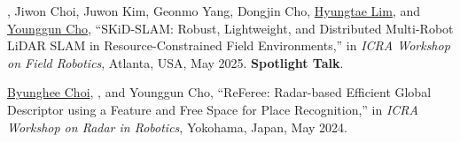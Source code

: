 \begin{pubSubsectionNum}
    \item \hogyunkim, Jiwon Choi, Juwon Kim, Geonmo Yang, Dongjin Cho, \underline{Hyungtae Lim}, and \underline{Younggun Cho}, ``SKiD-SLAM: Robust, Lightweight, and Distributed Multi-Robot LiDAR SLAM in Resource-Constrained Field Environments,'' in \textit{ICRA Workshop on Field Robotics}, Atlanta, USA, May 2025. \textbf{Spotlight Talk}.
    \item \underline{Byunghee Choi}, \underline{\hogyunkim}, and Younggun Cho, ``ReFeree: Radar-based Efficient Global Descriptor using a Feature and Free Space for Place Recognition,'' in \textit{ICRA Workshop on Radar in Robotics}, Yokohama, Japan, May 2024.
\end{pubSubsectionNum}
